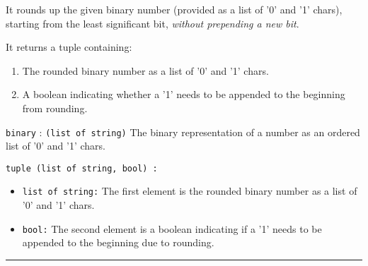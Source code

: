 \documentclass[12pt]{article}
\begin{document}
It rounds up the given binary number (provided as a list of '0' and '1' chars), starting from the least significant bit, \emph{without prepending a new bit}. 

It returns a tuple containing:
\begin{enumerate}
    \item The rounded binary number as a list of '0' and '1' chars.
    \item A boolean indicating whether a '1' needs to be appended to the beginning from rounding.
\end{enumerate}

\begin{description}
    \item[Parameters:]
    \item \texttt{binary} : \texttt{(list of string)} The binary representation of a number as an ordered list of '0' and '1' chars.

    \item[Returns:]
    \item \texttt{tuple (list of string, bool) :}
    \begin{itemize}
        \item \texttt{list of string:} The first element is the rounded binary number as a list of '0' and '1' chars.
        \item \texttt{bool:} The second element is a boolean indicating if a '1' needs to be appended to the beginning due to rounding.\\
    \end{itemize}
\end{description}
\hrule
\end{document}
